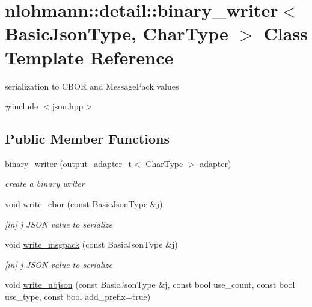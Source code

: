 \hypertarget{classnlohmann_1_1detail_1_1binary__writer}{}\section{nlohmann\+:\+:detail\+:\+:binary\+\_\+writer$<$ Basic\+Json\+Type, Char\+Type $>$ Class Template Reference}
\label{classnlohmann_1_1detail_1_1binary__writer}


serialization to C\+B\+OR and Message\+Pack values  




{\ttfamily \#include $<$json.\+hpp$>$}

\subsection*{Public Member Functions}
\begin{DoxyCompactItemize}
\item 
\hyperlink{classnlohmann_1_1detail_1_1binary__writer_a373289af95a946c19bb4a58a5df71a78}{binary\+\_\+writer} (\hyperlink{namespacenlohmann_1_1detail_a0fd8edff7729aa2dd92b070964bade2e}{output\+\_\+adapter\+\_\+t}$<$ Char\+Type $>$ adapter)
\begin{DoxyCompactList}\small\item\em create a binary writer \end{DoxyCompactList}\item 
void \hyperlink{classnlohmann_1_1detail_1_1binary__writer_aa0ab8d27fd88a33a2f801413ac4c7fbc}{write\+\_\+cbor} (const Basic\+Json\+Type \&j)\hypertarget{classnlohmann_1_1detail_1_1binary__writer_aa0ab8d27fd88a33a2f801413ac4c7fbc}{}\label{classnlohmann_1_1detail_1_1binary__writer_aa0ab8d27fd88a33a2f801413ac4c7fbc}

\begin{DoxyCompactList}\small\item\em \mbox{[}in\mbox{]} j J\+S\+ON value to serialize \end{DoxyCompactList}\item 
void \hyperlink{classnlohmann_1_1detail_1_1binary__writer_ae4e0852b64102ce4b07d99f08f828b7c}{write\+\_\+msgpack} (const Basic\+Json\+Type \&j)\hypertarget{classnlohmann_1_1detail_1_1binary__writer_ae4e0852b64102ce4b07d99f08f828b7c}{}\label{classnlohmann_1_1detail_1_1binary__writer_ae4e0852b64102ce4b07d99f08f828b7c}

\begin{DoxyCompactList}\small\item\em \mbox{[}in\mbox{]} j J\+S\+ON value to serialize \end{DoxyCompactList}\item 
void \hyperlink{classnlohmann_1_1detail_1_1binary__writer_a0f6c65053d859269f88eb4ebb0cd7060}{write\+\_\+ubjson} (const Basic\+Json\+Type \&j, const bool use\+\_\+count, const bool use\+\_\+type, const bool add\+\_\+prefix=true)
\end{DoxyCompactItemize}


